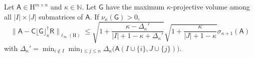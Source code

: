 \documentclass[onefignum,onetabnum]{siamart250211}
\renewenvironment{equation*}{\[}{\]\ignorespacesafterend}
\newcommand{\N}{\mathbb{N}}
\newcommand{\Hilb}{\mathrm{H}}
\newcommand{\Batrix}[1]{\bm{\Matrix{#1}}}
\newcommand{\Matrix}[1]{\mathsf{#1}}
\newcommand{\pinv}{\dagger}
\newcommand{\truncate}[3][]{#1\lfloor #2 #1\rfloor_{#3}}
\newcommand{\Index}[1]{{#1}}
\newcommand{\Norm}[3][]{#1\| #2 #1\|_{\mathrm{#3}}}
\begin{document}
\begin{theorem}
\label{theorem:cgr_error_maxvol}
Let $\Batrix{A} \in \Hilb^{m \times n}$ and $\kappa \in \N$.
Let $\Batrix{G}$ have the maximum $\kappa$-projective volume among all $|\Index{I}| \times |\Index{J}|$ submatrices of $\Batrix{A}$.
If $\nu_{\kappa}(\Batrix{G}) > 0$,
\begin{equation*}
    \Norm{\Batrix{A} - \Batrix{C} \truncate{\Batrix{G}}{\kappa}^\pinv \Batrix{R}}{\ell_{\infty}(\Hilb)} \leq \sqrt{1 + \frac{\kappa - \Delta_\kappa'}{|\Index{I}| + 1 - \kappa + \Delta_\kappa'}} \sqrt{1 + \frac{\kappa}{|\Index{J}| + 1 - \kappa}} \sigma_{\kappa + 1}(\Batrix{A})
\end{equation*}
with $\Delta_\kappa' = \min_{i \not\in \Index{I}} \min_{1 \leq j \leq n} \Delta_{\kappa}\big( \Batrix{A}(\Index{I} \cup \{i\}, \Index{J} \cup \{j\}) \big)$.
\end{theorem}
\end{document}
